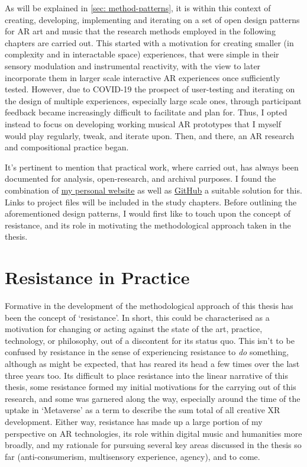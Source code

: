As will be explained in \autoref{sec: method-patterns}, it is within this context of creating, developing, implementing and iterating on a set of open design patterns for AR art and music that the research methods employed in the following chapters are carried out. This started with a motivation for creating smaller (in complexity and in interactable space) experiences, that were simple in their sensory modulation and instrumental reactivity, with the view to later incorporate them in larger scale interactive AR experiences once sufficiently tested. However, due to COVID-19 the prospect of user-testing and iterating on the design of multiple experiences, especially large scale ones, through participant feedback became increasingly difficult to facilitate and plan for. Thus, I opted instead to focus on developing working musical AR prototypes that I myself would play regularly, tweak, and iterate upon. Then, and there, an AR research and compositional practice began.

It's pertinent to mention that practical work, where carried out, has always been documented for analysis, open-research, and archival purposes. I found the combination of \href{https://sambilbow.github.io}{my personal website} as well as \href{https://github.com/sambilbow}{GitHub} a suitable solution for this. Links to project files will be included in the study chapters. Before outlining the aforementioned design patterns, I would first like to touch upon the concept of resistance, and its role in motivating the methodological approach taken in the thesis.



\section{Resistance in Practice} \label{sec: method-resistance}
Formative in the development of the methodological approach of this thesis has been the concept of `resistance'. In short, this could be characterised as a motivation for changing or acting against the state of the art, practice, technology, or philosophy, out of a discontent for its status quo. This isn't to be confused by resistance in the sense of experiencing resistance to \textit{do} something, although as might be expected, that has reared its head a few times over the last three years too. Its difficult to place resistance into the linear narrative of this thesis, some resistance formed my initial motivations for the carrying out of this research, and some was garnered along the way, especially around the time of the uptake in `Metaverse' as a term to describe the sum total of all creative XR development. Either way, resistance has made up a large portion of my perspective on AR technologies, its role within digital music and humanities more broadly, and my rationale for pursuing several key areas discussed in the thesis so far (anti-consumerism, multisensory experience, agency), and to come.

